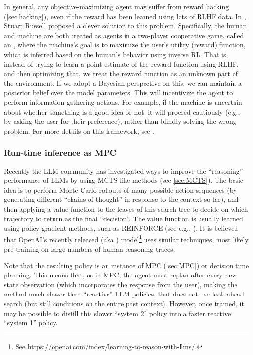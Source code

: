 In general, any objective-maximizing agent may suffer from reward hacking (\cref{sec:hacking}),
even if the reward has been learned using lots of RLHF data.
In  \citep{Russell2019}, Stuart Russell proposed a clever solution to this problem.
Specifically, the human and machine are both treated as agents in a
two-player cooperative game, called an ,
where the machine's goal is to maximize
the user's utility (reward) function, which is inferred based  on the human's behavior
using inverse RL.
%
That is, instead of trying to learn a point estimate
of the reward function using RLHF, and then optimizing that,
we treat the reward function as an unknown part of the environment.
If we adopt a Bayesian perspective on this, we can maintain a posterior
belief over the model parameters.
This will incentivize
the agent to perform information gathering actions.
For example,  if the machine is uncertain about whether something is a good idea or not,
it will proceed cautiously (e.g., by asking the user for their preference),
rather than blindly solving the wrong problem.
For more details on this framework, see \citep{Shah2020assistance}.



\subsubsection{Run-time inference as MPC}

Recently the LLM community has investigated ways to improve
the ``reasoning'' performance  of LLMs by using MCTS-like methods
(see \cref{sec:MCTS}).
The basic idea is to perform Monte Carlo rollouts of many possible
action sequences (by generating different ``chains of thought''
in response to the context so far),
and then applying a  value function to the leaves of this search tree
to decide on which trajectory to return as the final ``decision''.
The value function is usually learned using policy gradient methods,
such as REINFORCE (see e.g., \citep{Zelikman2024}).
It is believed that OpenAI's
recently released 
 (aka ) model\footnote{
%
See \url{https://openai.com/index/learning-to-reason-with-llms/}.
}%
uses similar techniques,
most likely pre-training on large numbers of human reasoning traces.

Note that the resulting policy is an instance of MPC (\cref{sec:MPC})
or decision time planning.
This means that, as in MPC, the agent must replan
after every new state observation (which incorporates
the response from the user),  making the method much
slower than ``reactive'' LLM policies, that does not use look-ahead
search (but still conditions on the entire past context).
However, once trained, it may be possible to distill this slower ``system 2'' policy
into a faster reactive ``system 1'' policy.


